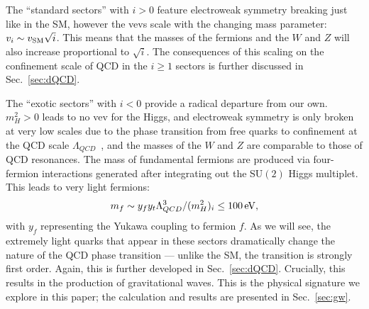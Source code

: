 \documentclass[nofootinbib,twocolumn,preprintnumbers]{revtex4-1}
\begin{document}
%
The ``standard sectors'' with $i>0$ feature electroweak symmetry breaking just like in the SM, however the vevs scale with the changing mass parameter: $v_i \sim v_{\rm SM}\sqrt{i}$. This means that the masses of the fermions and the $W$ and $Z$ will also increase proportional to $\sqrt{i}$. The consequences of this scaling on the confinement scale of QCD in the $i \geq 1$ sectors is further discussed in Sec.~\ref{sec:dQCD}. 

The ``exotic sectors'' with $i<0$ provide a radical departure from our own. $m_H^2 > 0$ leads to no vev for the Higgs, and electroweak symmetry is only broken at very low scales due to the phase transition from free quarks to confinement at the QCD scale $\Lambda_{QCD}$~\cite{Susskind:1978ms}, and the masses of the $W$ and $Z$ are comparable to those of QCD resonances. The mass of fundamental fermions are produced via four-fermion interactions generated after integrating out the SU$(2)$ Higgs multiplet. This leads to very light fermions: 
\begin{equation}\label{eqn:exoticFM}
m_f \sim y_f y_t \Lambda_{QCD}^3/(m^2_H)_i \leq 100 \,{\rm eV},
\end{equation}
with $y_f$ representing the Yukawa coupling to fermion $f$. As we will see, the extremely light quarks that appear in these sectors dramatically change the nature of the QCD phase transition --- unlike the SM, the transition is strongly first order. Again, this is further developed in Sec.~\ref{sec:dQCD}. Crucially, this results in the production of gravitational waves. This is the physical signature we explore in this paper; the calculation and results are presented in Sec.~\ref{sec:gw}. 
\end{document}
